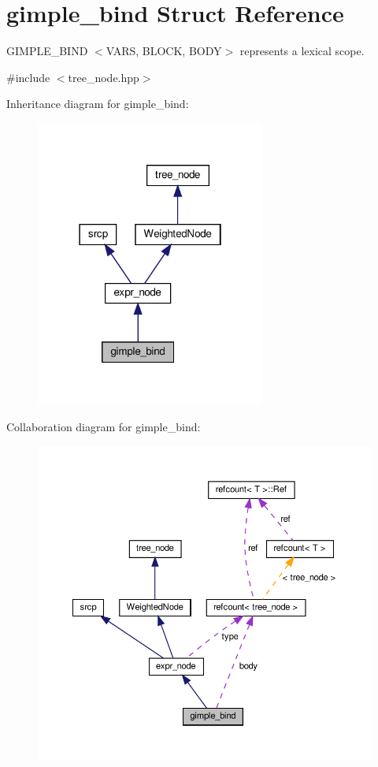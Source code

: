 \hypertarget{structgimple__bind}{}\section{gimple\+\_\+bind Struct Reference}
\label{structgimple__bind}


G\+I\+M\+P\+L\+E\+\_\+\+B\+I\+ND $<$V\+A\+RS, B\+L\+O\+CK, B\+O\+DY$>$ represents a lexical scope.  




{\ttfamily \#include $<$tree\+\_\+node.\+hpp$>$}



Inheritance diagram for gimple\+\_\+bind\+:
\nopagebreak
\begin{figure}[H]
\begin{center}
\leavevmode
\includegraphics[width=214pt]{d3/d72/structgimple__bind__inherit__graph}
\end{center}
\end{figure}


Collaboration diagram for gimple\+\_\+bind\+:
\nopagebreak
\begin{figure}[H]
\begin{center}
\leavevmode
\includegraphics[width=350pt]{de/d94/structgimple__bind__coll__graph}
\end{center}
\end{figure}
